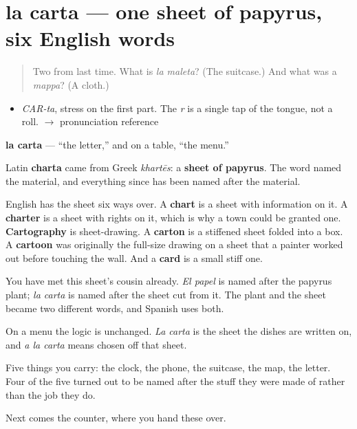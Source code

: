 \section[la carta]{la carta — one sheet of papyrus, six English words}

\label{lesson:ES-C312-carta}



\begin{quote}
Two from last time. What is \emph{la maleta}? (The suitcase.) And what was a \emph{mappa}? (A cloth.)
\end{quote}

\begin{sounds}
\begin{itemize}
\raggedright
  \item \emph{CAR-ta}, stress on the first part. The \emph{r} is a single tap of the tongue, not a roll. $\to$ pronunciation reference
\end{itemize}
\end{sounds}

\begin{cousinweb}
\textbf{la carta} — \textquotedblleft{}the letter,\textquotedblright{} and on a table, \textquotedblleft{}the menu.\textquotedblright{}

Latin \textbf{charta} came from Greek \emph{khartēs}: a \textbf{sheet of papyrus}. The word named the material, and everything since has been named after the material.

English has the sheet six ways over. A \textbf{chart} is a sheet with information on it. A \textbf{charter} is a sheet with rights on it, which is why a town could be granted one. \textbf{Cartography} is sheet-drawing. A \textbf{carton} is a stiffened sheet folded into a box. A \textbf{cartoon} was originally the full-size drawing on a sheet that a painter worked out before touching the wall. And a \textbf{card} is a small stiff one.

You have met this sheet's cousin already. \emph{El papel} is named after the papyrus plant; \emph{la carta} is named after the sheet cut from it. The plant and the sheet became two different words, and Spanish uses both.

On a menu the logic is unchanged. \emph{La carta} is the sheet the dishes are written on, and \emph{a la carta} means chosen off that sheet.
\end{cousinweb}

\begin{grammarlens}[title={What you've built}]
Five things you carry: the clock, the phone, the suitcase, the map, the letter. Four of the five turned out to be named after the stuff they were made of rather than the job they do.

Next comes the counter, where you hand these over.
\end{grammarlens}

